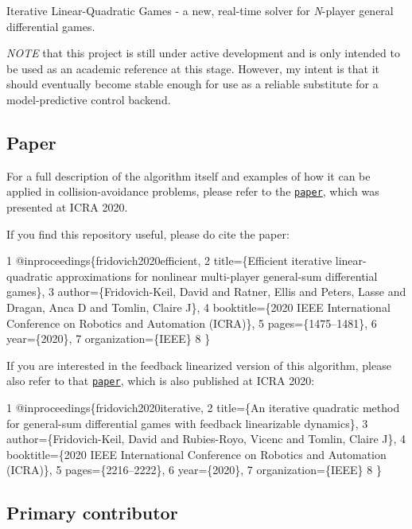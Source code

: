  

Iterative Linear-\/\+Quadratic Games -\/ a new, real-\/time solver for {\itshape N}-\/player general differential games.

{\itshape N\+O\+TE} that this project is still under active development and is only intended to be used as an academic reference at this stage. However, my intent is that it should eventually become stable enough for use as a reliable substitute for a model-\/predictive control backend.

\subsection*{Paper}

For a full description of the algorithm itself and examples of how it can be applied in collision-\/avoidance problems, please refer to the \href{https://arxiv.org/abs/1909.04694}{\tt paper}, which was presented at I\+C\+RA 2020.

If you find this repository useful, please do cite the paper\+: 
\begin{DoxyCode}
1 @inproceedings\{fridovich2020efficient,
2   title=\{Efficient iterative linear-quadratic approximations for nonlinear multi-player general-sum
       differential games\},
3   author=\{Fridovich-Keil, David and Ratner, Ellis and Peters, Lasse and Dragan, Anca D and Tomlin, Claire
       J\},
4   booktitle=\{2020 IEEE International Conference on Robotics and Automation (ICRA)\},
5   pages=\{1475--1481\},
6   year=\{2020\},
7   organization=\{IEEE\}
8 \}
\end{DoxyCode}
 If you are interested in the feedback linearized version of this algorithm, please also refer to that \href{https://arxiv.org/abs/1910.00681}{\tt paper}, which is also published at I\+C\+RA 2020\+: 
\begin{DoxyCode}
1 @inproceedings\{fridovich2020iterative,
2   title=\{An iterative quadratic method for general-sum differential games with feedback linearizable
       dynamics\},
3   author=\{Fridovich-Keil, David and Rubies-Royo, Vicenc and Tomlin, Claire J\},
4   booktitle=\{2020 IEEE International Conference on Robotics and Automation (ICRA)\},
5   pages=\{2216--2222\},
6   year=\{2020\},
7   organization=\{IEEE\}
8 \}
\end{DoxyCode}


\subsection*{Primary contributor}

